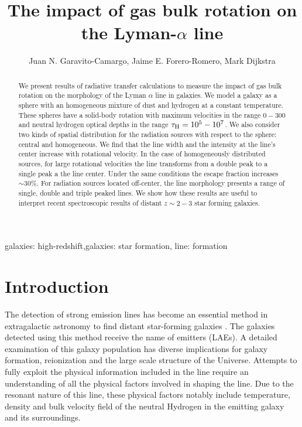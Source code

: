 \documentclass{emulateapj}
\newcommand{\ly}{{\ifmmode{{\rm Ly}\alpha~}\else{Ly$\alpha$~}\fi}}
\newcommand{\kms}{{\ifmmode{{\mathrm{\,km\ s}^{-1}}}\else{\,km~s$^{-1}$}\fi}}
\begin{document}
\title{The impact of gas bulk rotation on the Lyman-$\alpha$ line} 
\author{
  Juan N. Garavito-Camargo,
  Jaime E. Forero-Romero,
  Mark Dijkstra
}


\begin{abstract}
We present results of radiative transfer calculations to measure
the impact of gas bulk rotation on the morphology of the Lyman
$\alpha$ line in galaxies. We model a galaxy as a sphere with an
homogeneous mixture of dust and hydrogen at a constant
temperature. These spheres have a solid-body rotation with
maximum velocities in the range $0-300$ \kms and neutral
hydrogen optical depths in the range $\tau_{\rm
H}=10^{5}-10^{7}$. We also consider two kinds of spatial
distribution for the radiation sources with respect to the sphere:
central and homogeneous. We find that the line width and the intensity
at the line's center increase with rotational velocity. In the case of homogeneously distributed
sources, for large rotational velocities the line transforms from a
double peak to a single peak a the line center. Under the same
conditions the escape fraction increases $\sim 30\%$. For
radiation sources located off-center, the line morphology presents a
range of single, double and triple peaked lines. We show how these results are
useful to interpret recent spectroscopic results of distant $z\sim 2-3$ star
forming galaxies.
\end{abstract}

\begin{keywords}
{galaxies: high-redshift,galaxies: star formation, line: formation}
\end{keywords}


\section{Introduction}
\label{sec:intro}

The detection of strong \ly emission lines has become an essential
method in extragalactic astronomy to find distant star-forming
galaxies
\citep{PartridgePeebles,Rhoads00,Gawiser2007,Koehler2007,Ouchi08,Yamada2012,Schenker2012}.
The galaxies detected using this method receive the 
name of \ly emitters (LAEs). A detailed examination of this galaxy
population has diverse implications for galaxy formation, reionization
and the large scale structure of the Universe. Attempts to fully
exploit the physical information included in the \ly line require an
understanding of all the physical factors involved in shaping the
line. Due to the resonant nature of this line, these physical factors
notably include temperature, density and bulk velocity field of the neutral
Hydrogen in the emitting galaxy and its surroundings.
\end{document}
